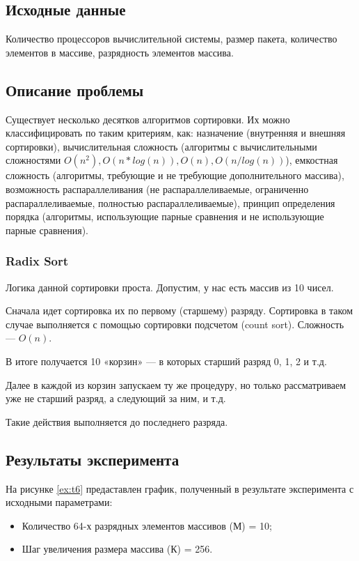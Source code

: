 \subsection*{Исходные данные}
Количество процессоров вычислительной системы, размер пакета, количество элементов в массиве, разрядность элементов массива.

\subsection*{Описание проблемы}
Существует несколько десятков алгоритмов сортировки. Их можно классифицировать по таким критериям, как: назначение (внутренняя и внешняя сортировки), вычислительная сложность (алгоритмы с вычислительными сложностями $O(n^2), O(n*log(n)), O(n), O(n/log(n))$), емкостная сложность (алгоритмы, требующие и не требующие дополнительного массива), возможность распараллеливания (не распараллеливаемые, ограниченно распараллеливаемые, полностью распараллеливаемые), принцип определения порядка (алгоритмы, использующие парные сравнения и не использующие парные сравнения).  

\subsubsection{Radix Sort}

Логика данной сортировки проста. Допустим, у нас есть массив из 10 чисел.

Сначала идет сортировка их по первому (старшему) разряду. Сортировка в таком случае выполняется с помощью сортировки подсчетом (count sort). Сложность — $O(n)$. 

В итоге получается 10 «корзин» — в которых старший разряд 0, 1, 2 и т.д.

Далее в каждой из корзин запускаем ту же процедуру, но только рассматриваем уже не старший разряд, а следующий за ним, и т.д.

Такие действия выполняется до последнего разряда.

\subsection*{Результаты эксперимента}
На рисунке \ref{ex:t6} предаставлен график, полученный в результате эксперимента с исходными параметрами:
\begin{itemize}
	\item Количество 64-х разрядных элементов массивов (М) = 10;
	\item Шаг увеличения размера массива (К) = 256.
\end{itemize}

